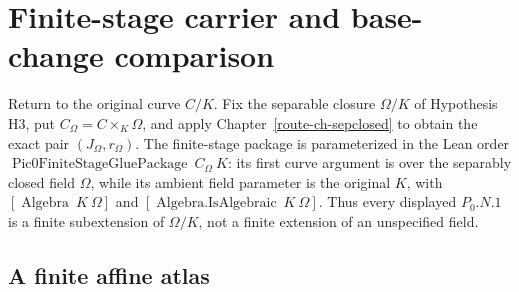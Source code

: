 \chapter{Finite-stage carrier and base-change comparison}
\label{route-ch-finite-stage}

Return to the original curve \(C/K\).  Fix the separable closure
\(\Omega/K\) of Hypothesis H3, put \(C_\Omega=C\times_K\Omega\), and apply
Chapter~\ref{route-ch-sepclosed} to obtain the exact pair
\((J_\Omega,r_\Omega)\).  The finite-stage package is parameterized in the
Lean order \(\operatorname{Pic0FiniteStageGluePackage}\ C_\Omega\ K\): its
first curve argument is over the separably closed field \(\Omega\), while its
ambient field parameter is the original \(K\), with
\([\operatorname{Algebra}\ K\ \Omega]\) and
\([\operatorname{Algebra.IsAlgebraic}\ K\ \Omega]\).  Thus every displayed
\(P_0.N.1\) is a finite subextension of \(\Omega/K\), not a finite extension
of an unspecified field.

\section{A finite affine atlas}

